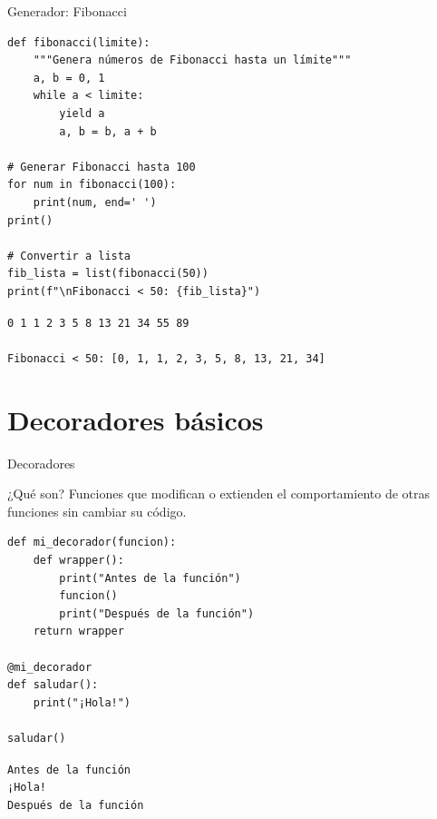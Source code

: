\documentclass{beamer}
\begin{document}
\begin{frame}[fragile]{Generador: Fibonacci \faInfinity}
\begin{lstlisting}
def fibonacci(limite):
    """Genera números de Fibonacci hasta un límite"""
    a, b = 0, 1
    while a < limite:
        yield a
        a, b = b, a + b

# Generar Fibonacci hasta 100
for num in fibonacci(100):
    print(num, end=' ')
print()

# Convertir a lista
fib_lista = list(fibonacci(50))
print(f"\nFibonacci < 50: {fib_lista}")
\end{lstlisting}

\vspace{-0.2cm}
\begin{tcolorbox}[colback=green!10,colframe=green,title={\small\faArrowCircleRight \ Salida},coltitle=fg0,left=3pt,right=3pt,top=2pt,bottom=2pt,boxsep=1pt]
\small\texttt{0 1 1 2 3 5 8 13 21 34 55 89\\
\ \\
Fibonacci < 50: [0, 1, 1, 2, 3, 5, 8, 13, 21, 34]}
\end{tcolorbox}
\end{frame}

\section{Decoradores básicos}

\begin{frame}[fragile]{Decoradores \faMagic}
\begin{conceptbox}{¿Qué son?}
Funciones que modifican o extienden el comportamiento de otras funciones sin cambiar su código.
\end{conceptbox}

\begin{lstlisting}
def mi_decorador(funcion):
    def wrapper():
        print("Antes de la función")
        funcion()
        print("Después de la función")
    return wrapper

@mi_decorador
def saludar():
    print("¡Hola!")

saludar()
\end{lstlisting}

\vspace{-0.2cm}
\begin{tcolorbox}[colback=green!10,colframe=green,title={\small\faArrowCircleRight \ Salida},coltitle=fg0,left=3pt,right=3pt,top=2pt,bottom=2pt,boxsep=1pt]
\small\texttt{Antes de la función\\
¡Hola!\\
Después de la función}
\end{tcolorbox}
\end{frame}
\end{document}
